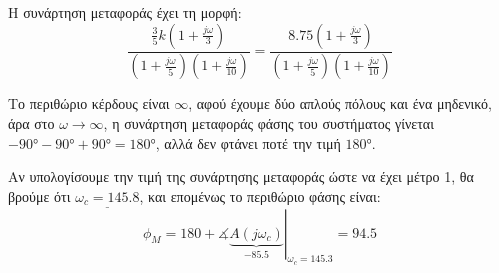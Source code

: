 \documentclass[11pt,a4paper,notitlepage,fleqn]{article}
\begin{document}
\begin{exercise}[Παράδειγμα]
\tcbsubtitle{}
Η συνάρτηση μεταφοράς έχει τη μορφή:
\[
\frac{\frac{3}{5}k \left(1+\frac{j\omega }{3}\right)  }{\left( 1+\frac{j\omega }{5} \right)
	\left(1+\frac{j\omega }{10}\right)}
= \frac{8.75 \left(1+\frac{j\omega }{3}\right)  }{\left( 1+\frac{j\omega }{5} \right)
	\left(1+\frac{j\omega }{10}\right)}
\]

Το περιθώριο κέρδους είναι \( \infty \), αφού έχουμε δύο απλούς πόλους και ένα μηδενικό,
άρα στο \( \omega\to \infty \), η συνάρτηση μεταφοράς φάσης του συστήματος γίνεται
\( -\ang{90}-\ang{90}+\ang{90} = \ang{180} \), αλλά δεν φτάνει ποτέ την τιμή \( \ang{180} \).

Αν υπολογίσουμε την τιμή της συνάρτησης μεταφοράς ώστε να έχει μέτρο 1, θα βρούμε ότι
\( \underline{\omega_c = 145.8} \), και επομένως το περιθώριο φάσης είναι:
\[
\phi_M = \left. 180 + \measuredangle \underbrace{A(j\omega_c)}_{-85.5}
\right|_{\omega_c=145.3} = 94.5
\]

\end{exercise}
\end{document}
